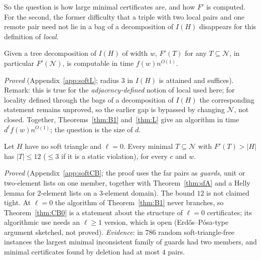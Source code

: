 So the question is how large minimal certificates are, and how $F'$ is computed. For the second, the former difficulty that a triple with two local pairs and one remote pair need not lie in a bag of a decomposition of $I(H)$ disappears for this definition of \emph{local}.
\begin{theorem}\label{thm:L}
Given a tree decomposition of $I(H)$ of width $w$, $F'(T)$ for any $T\subseteq\mathcal N$, in particular $F'(\mathcal N)$, is computable in time $f(w)n^{O(1)}$.
\end{theorem}
\emph{Proved} (Appendix~\ref{app:softL}; radius $3$ in $I(H)$ is attained and suffices). Remark: this is true for the \emph{adjacency-defined} notion of local used here; for locality defined through the bags of a decomposition of $I(H)$ the corresponding statement remains unproved, so the earlier gap is bypassed by changing $\mathcal N$, not closed. Together, Theorems~\ref{thm:B1} and~\ref{thm:L} give an algorithm in time $d^{\ell}f(w)n^{O(1)}$; the question is the size of $d$.

\begin{theorem}[Core bound at $\ell=0$ without soft triangles]\label{thm:CB0}
Let $H$ have no soft triangle and $\ell=0$. Every minimal $T\subseteq\mathcal N$ with $F'(T)>|H|$ has $|T|\le12$ ($\le3$ if it is a static violation), for every $c$ and $w$.
\end{theorem}
\emph{Proved} (Appendix~\ref{app:softCB}; the proof uses the far pairs as \emph{guards}, unit or two-element lists on one member, together with Theorem~\ref{thm:sfA} and a Helly lemma for $2$-element lists on a $3$-element domain). The bound $12$ is not claimed tight. At $\ell=0$ the algorithm of Theorem~\ref{thm:B1} never branches, so Theorem~\ref{thm:CB0} is a statement about the structure of $\ell=0$ certificates; its algorithmic use needs an $\ell\ge1$ version, which is open (Erd\H{o}s--P\'osa-type argument sketched, not proved). \emph{Evidence}: in $786$ random soft-triangle-free instances the largest minimal inconsistent family of guards had two members, and minimal certificates found by deletion had at most $4$ pairs.

